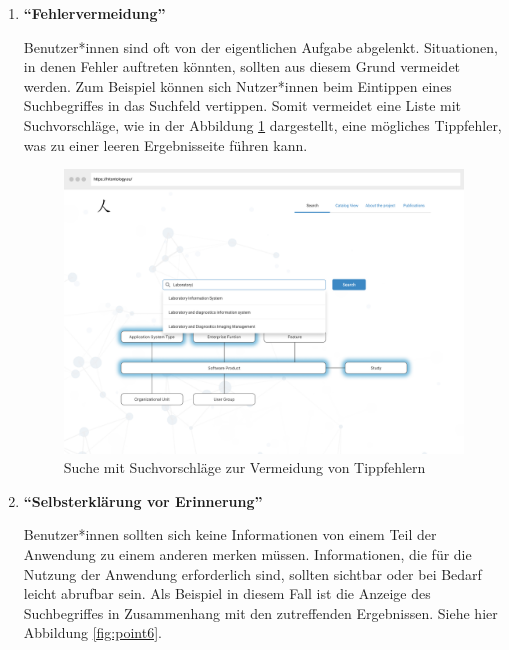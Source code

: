 \begin{enumerate}

\item \textbf{\enquote{Fehlervermeidung}} \newline

Benutzer*innen sind oft von der eigentlichen Aufgabe abgelenkt.
Situationen, in denen Fehler auftreten könnten, sollten aus diesem Grund vermeidet werden.
Zum Beispiel können sich Nutzer*innen beim Eintippen eines Suchbegriffes in das Suchfeld vertippen.
Somit vermeidet eine Liste mit Suchvorschläge, wie in der Abbildung \ref{fig:point5_danach} dargestellt, eine mögliches Tippfehler, was zu einer leeren Ergebnisseite führen kann.

\begin{figure}[H]
	\centering
    	\includegraphics[width=1.45\textwidth, angle=-90]{Images/Mockup_Startseite_3}
   	\caption[Suche mit Suchvorschläge]{Suche mit Suchvorschläge zur Vermeidung von Tippfehlern}
   	\label{fig:point5_danach}
\end{figure}

\clearpage


\item \textbf{\enquote{Selbsterklärung vor Erinnerung}} \newline

Benutzer*innen sollten sich keine Informationen von einem Teil der Anwendung zu einem anderen merken müssen. 
Informationen, die für die Nutzung der Anwendung erforderlich sind, sollten sichtbar oder bei Bedarf leicht abrufbar sein.
Als Beispiel in diesem Fall ist die Anzeige des Suchbegriffes in Zusammenhang mit den zutreffenden Ergebnissen.
Siehe hier Abbildung \ref{fig:point6}.


\end{enumerate}
